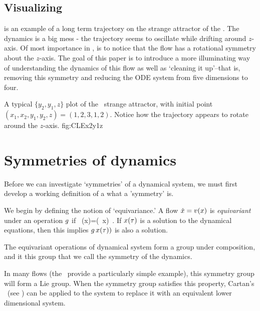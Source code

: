 {    \ifarticle
    \else

\subsection{Visualizing \cLf}

 is an example of a long term trajectory on the strange attractor of the \cLe. The dynamics is a big mess - the
trajectory seems to oscillate while drifting around $z$-axis.
Of most importance in , is to notice
that the flow has a rotational symmetry about the $z$-axis.
The goal of this paper is to introduce a more
illuminating way of understanding the dynamics of this flow
as well as `cleaning it up'--that is, removing this
symmetry and reducing the ODE system from five dimensions to
four.

    \fi

{}{
A typical $\{y_2,y_1,z\}$ plot of the \cLf\ strange attractor,
with initial point
$(x_1, x_2, y_1, y_2, z) = (1, 2, 3, 1, 2)$. Notice how the trajectory appears to rotate around the $z$-axis.
    }{fig:CLEx2y1z}

\section{Symmetries of dynamics}
\label{sect:SymmDyn}

Before we can investigate `symmetries' of a dynamical system, we must first develop a working definition of a what a 'symmetry' is.

We begin by defining the notion of `equivariance.'
A flow $\dot{x}= v(x)$ is \emph{equivariant} under an operation $g$ if
\beq
\LieEl \, \vel(x)=\vel(\LieEl \, x)
\,.
If $x(\tau)$ is a solution to the dynamical
equations, then this implies $g\,x(\tau))$ is also a solution.

The equivariant operations of dynamical system form a group under composition, and it this group that we call the symmetry of the dynamics.

In many flows (the \cLe\ provide a particularly simple example),
this symmetry group will form a Lie group. When the symmetry group satisfies this property, Cartan's \mslices\ (see ) can be applied to the system to replace it with an equivalent lower dimensional system.


}
